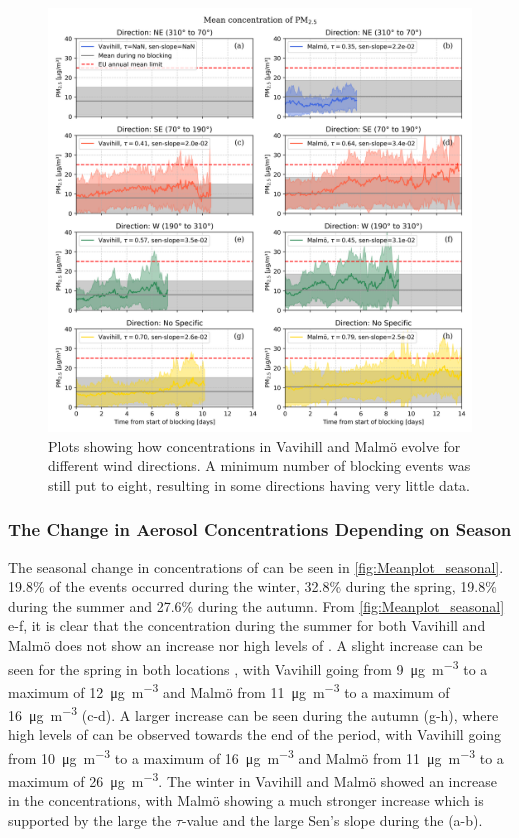 \begin{figure}[H]
    \centering
    \includegraphics[width=\textwidth]{Figures/Meanplot_dir.png}
    \caption{Plots showing how \PM concentrations in Vavihill and Malmö evolve for different wind directions. A minimum number of blocking events was still put to eight, resulting in some directions having very little data.}
    \label{fig:Meanplot_wind}
\end{figure}

\newpage 


\subsubsection{The Change in Aerosol Concentrations Depending on Season}
The seasonal change in concentrations of \PM can be seen in \autoref{fig:Meanplot_seasonal}. 19.8\% of the events occurred during the winter, 32.8\% during the spring, 19.8\% during the summer and 27.6\% during the autumn. From \autoref{fig:Meanplot_seasonal} e-f, it is clear that the concentration during the summer for both Vavihill and Malmö does not show an increase nor high levels of \PM. A slight increase can be seen for the spring in both locations , with Vavihill going from \SI{9}{\micro\gram\per\meter\cubed} to a maximum of \SI{12}{\micro\gram\per\meter\cubed} and Malmö from \SI{11}{\micro\gram\per\meter\cubed} to a maximum of \SI{16}{\micro\gram\per\meter\cubed} (c-d). A larger increase can be seen during the autumn (g-h), where high levels of \PM can be observed towards the end of the period, with Vavihill going from \SI{10}{\micro\gram\per\meter\cubed} to a maximum of \SI{16}{\micro\gram\per\meter\cubed} and Malmö from \SI{11}{\micro\gram\per\meter\cubed} to a maximum of \SI{26}{\micro\gram\per\meter\cubed}. The winter in Vavihill and Malmö showed an increase in the \PM concentrations, with Malmö showing a much stronger increase which is supported by the large the $\tau$-value and the large Sen's slope during the (a-b). 

